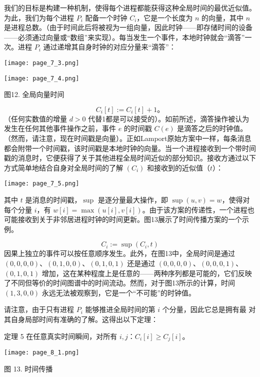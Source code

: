 \documentclass[12pt,a4paper]{report} %
\begin{document}
我们的目标是构建一种机制，使得每个进程都能获得这种全局时间的最优近似值。为此，我们为每个进程 $P_{i}$ 配备一个时钟 $C_{i}$，它是一个长度为 $n$ 的向量，其中 $n$ 是进程总数。（由于时间此后将被视为一组向量，因此时钟——即存储时间的设备——必须通过向量或“数组”来实现）。每当发生一个事件，本地时钟就会“滴答”一次。进程 $P_{i}$ 通过递增其自身时钟的对应分量来“滴答”：\begin{center}
\texttt{[image: page\_7\_3.png]}
\end{center}
\begin{center}
\begin{center}
\texttt{[image: page\_7\_4.png]}
\end{center}
\begin{center}
图12. 全局向量时间
\end{center}
\end{center}$$C_{i}[t]:=C_{i}[t]+1。$$（任何实数值的增量 $d>0$ 代替1都是可以接受的）。如前所述，滴答操作被认为发生在任何其他事件操作之前，事件 $e$ 的时间戳 $C(e)$ 是滴答之后的时钟值。（然而，请注意，现在时间戳是向量）。正如Lamport原始方案中一样，每条消息都会附带一个时间戳，该时间戳是本地时钟的向量。当一个进程接收到一个带时间戳的消息时，它便获得了关于其他进程全局时间近似的部分知识。接收方通过以下方式简单地结合自身对全局时间的了解 $\left(C_{i}\right)$ 和接收到的近似值（$t$）：\begin{center}
\texttt{[image: page\_7\_5.png]}
\end{center}
\begin{center}
其中 $t$ 是消息的时间戳，$\sup$ 是逐分量最大操作，即 $\sup (u, v)=w$，使得对每个分量 $i$，有 $w[i]=\max (u[i], v[i])$。由于该方案的传递性，一个进程也可能接收到关于非邻居进程时钟的时间更新。图13展示了时间传播方案的一个示例。
\end{center}$$C_{i}:=\sup \left(C_{i}, t\right)$$ 因果上独立的事件可以按任意顺序发生。此外，在图13中，全局时间是通过 $(0,0,0,0)$、$(0,1,0,0)$、$(0,1,0,1)$ 还是通过 $(0,0,0,0)$、$(0,0,0,1)$、$(0,1,0,1)$ 增加，这在某种程度上是任意的——两种序列都是可能的，它们反映了不同但等价的时间图谱中的时间流动。然而，对于图13所示的计算，时间 $(1,3,0,0)$ 永远无法被观察到，它是一个“不可能”的时钟值。

请注意，由于只有进程 $P_{i}$ 能够推进全局时间的第 $i$ 个分量，因此它总是拥有最
对其自身局部时间有准确的了解。这得出以下定理：

定理 5 在任意真实时间瞬间，对所有 $i, j$：$C_{i}[i] \geq C_{j}[i]$。

\begin{center}
\texttt{[image: page\_8\_1.png]}
\end{center}
\begin{center}
图 13. 时间传播
\end{center}
\end{document}
